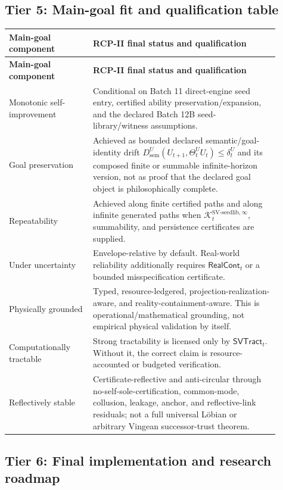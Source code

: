 \documentclass[11pt]{article}
\newcommand{\1}{\mathbf{1}}
\providecommand{\Kcal}{\mathcal{K}}
\providecommand{\sem}{\mathrm{sem}}
\begin{document}
\subsection{Tier 5: Main-goal fit and qualification table}

\begin{longtable}{@{}p{0.28\linewidth}p{0.62\linewidth}@{}}
\toprule
\textbf{Main-goal component} & \textbf{RCP-II final status and qualification}\\
\midrule
\endfirsthead
\toprule
\textbf{Main-goal component} & \textbf{RCP-II final status and qualification}\\
\midrule
\endhead
\bottomrule
\endfoot
Monotonic self-improvement & Conditional on Batch 11 direct-engine seed entry, certified ability preservation/expansion, and the declared Batch 12B seed-library/witness assumptions.\\
\midrule
Goal preservation & Achieved as bounded declared semantic/goal-identity drift \(D_{\sem}^U(U_{t+1},\Theta_t^UU_t)\le\delta_t^U\) and its composed finite or summable infinite-horizon version, not as proof that the declared goal object is philosophically complete.\\
\midrule
Repeatability & Achieved along finite certified paths and along infinite generated paths when \(\Kcal_t^{\mathrm{SV\mbox{-}seedlib},\infty}\), summability, and persistence certificates are supplied.\\
\midrule
Under uncertainty & Envelope-relative by default. Real-world reliability additionally requires \(\mathsf{RealCont}_t\) or a bounded misspecification certificate.\\
\midrule
Physically grounded & Typed, resource-ledgered, projection-realization-aware, and reality-containment-aware. This is operational/mathematical grounding, not empirical physical validation by itself.\\
\midrule
Computationally tractable & Strong tractability is licensed only by \(\mathsf{SVTract}_t\). Without it, the correct claim is resource-accounted or budgeted verification.\\
\midrule
Reflectively stable & Certificate-reflective and anti-circular through no-self-sole-certification, common-mode, collusion, leakage, anchor, and reflective-link residuals; not a full universal L\"obian or arbitrary Vingean successor-trust theorem.\\
\end{longtable}

\subsection{Tier 6: Final implementation and research roadmap}
\end{document}
